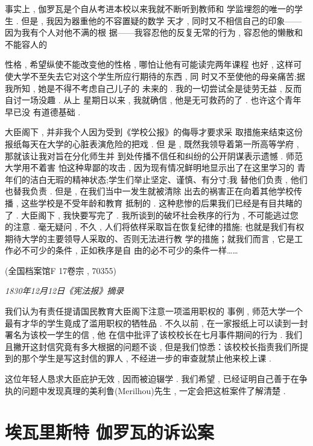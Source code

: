 事实上 , 伽罗瓦是个自从考进本校以来我就不断听到教师和 学监埋怨的唯一的学生 . 但是 , 我因为器重他的不容置疑的数学 天才 , 同时又不相信自己的印象——因为我有个人对他不满的根 据——我容忍他的反复无常的行为 , 容忍他的懒散和不能容人的

性格 , 希望纵使不能改变他的性格 , 哪怕让他有可能读完两年课程 也好 , 这样可使大学不至失去它对这个学生所应行期待的东西 , 同 时又不至使他的母亲痛苦;据我所知 , 她是不得不考虑自己儿子的 未来的 . 我的一切尝试全是徒劳无益 , 反而自讨一场没趣 . 从上 星期日以来 , 我就确信 , 他是无可救药的了 . 也许这个青年早已没 有道德基础 . 

大臣阁下 , 并非我个人因为受到《学校公报》的侮辱才要求采 取措施来结束这份报纸每天在大学的心脏表演危险的把戏 . 但 是 , 既然我领导着第一所高等学府 , 那就该让我对旨在分化师生并 到处传播不信任和纠纷的公开阴谋表示遗憾 . 师范大学用不着害 怕这种卑鄙的攻击 , 因为现有情况鲜明地显示出了在这里学习的 青年们的洁白无瑕的精神状态;学生们举止坚定、谨慎、有分寸;我 替他们负责 , 他们也替我负责 . 但是 , 在我们当中一发生就被清除 出去的祸害正在向着其他学校传播 , 这些学校是不受年龄和教育 抵制的 . 这种悲惨的后果我们已经是有目共睹的了 . 大臣阁下 ,  我快要写完了 . 我所谈到的破坏社会秩序的行为 , 不可能逃过您 的注意 . 毫无疑问 , 不久 , 人们将依样采取旨在恢复纪律的措施; 也就是我们有权期待大学的主要领导人采取的、否则无法进行教 学的措施；就我们而言 , 它是工作必不可少的条件 , 正如秩序是自 由的必不可少的条件一样……

\begin{flushright}
	(全国档案馆F 17卷宗 , 70355)
\end{flushright}

\begin{center}
	\emph{1830年12月12日《宪法报》摘录}
\end{center}

我们认为有责任提请国民教育大臣阁下注意一项滥用职权的 事例 , 师范大学一个最有才华的学生竟成了滥用职权的牺牲品 .  不久以前 , 在一家报纸上可以读到一封署名为该校一学生的信 , 他 在信中批评了该校校长在七月事件期间的行为 . 我们且撇开这封信究竟有多大根据的问题不谈 , 但是我们惊悉：该校校长指责我们所提到的那个学生是写这封信的罪人 , 不经进一步的审查就禁止他来校上课 . 

这位年轻人恳求大臣庇护无效 , 因而被迫辍学 . 我们希望 , 已经证明自己善于在争执的问题中发现真理的美利鲁(Merilhou)先生 , 一定会把这桩案件了解清楚 . 

\section{埃瓦里斯特 \textbullet 伽罗瓦的诉讼案}

